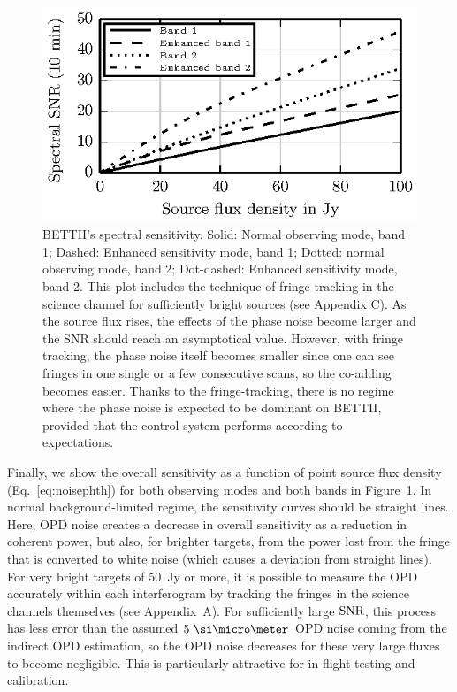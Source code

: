 \begin{figure}[!h]
\begin{center}
\includegraphics[width=\textwidth]{Figures/f4.eps}
\caption[BETTII Spectral SNR]{%
BETTII's spectral sensitivity. Solid: Normal observing mode, band 1; Dashed: Enhanced sensitivity mode, band 1; Dotted: normal observing mode, band 2; Dot-dashed: Enhanced sensitivity mode, band 2. This plot includes the technique of fringe tracking in the science channel for sufficiently bright sources (see Appendix C). As the source flux rises, the effects of the phase noise become larger and the SNR should reach an asymptotical value. However, with fringe tracking, the phase noise itself becomes smaller since one can see fringes in one single or a few consecutive scans, so the co-adding becomes easier. Thanks to the fringe-tracking, there is no regime where the phase noise is expected to be dominant on BETTII, provided that the control system performs according to expectations.}
\label{fig:SpectralSNR}
\end{center}
\end{figure}

Finally, we show the overall sensitivity as a function of point source flux density (Eq.~\ref{eq:noisephth}) for both observing modes and both bands in Figure~\ref{fig:SpectralSNR}. In normal background-limited regime, the sensitivity curves should be straight lines. Here, OPD noise creates a decrease in overall sensitivity as a reduction in coherent power, but also, for brighter targets, from the power lost from the fringe that is converted to white noise (which causes a deviation from straight lines). For very bright targets of 50~Jy or more, it is possible to measure the OPD accurately within each interferogram by tracking the fringes in the science channels themselves (see Appendix~A). For sufficiently large $\textrm{SNR}$, this process has less error than the assumed $5~\um$ OPD noise coming from the indirect OPD estimation, so the OPD noise decreases for these very large fluxes to become negligible. This is particularly attractive for in-flight testing and calibration.

